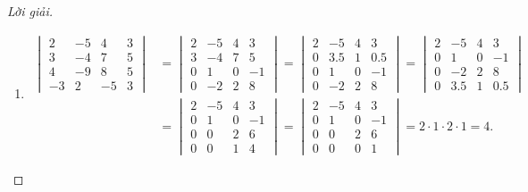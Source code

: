 \documentclass[class=linear-algebra,crop=false]{standalone}
\begin{document}
\begin{proof}[Lời giải]
	\begin{enumerate}[label = (\alph*)]
		\item
		      \begin{align*}
			      \begin{vmatrix}
				      2  & -5 & 4  & 3 \\
				      3  & -4 & 7  & 5 \\
				      4  & -9 & 8  & 5 \\
				      -3 & 2  & -5 & 3
			      \end{vmatrix}
			       & =
			      \begin{vmatrix}
				      2 & -5 & 4 & 3  \\
				      3 & -4 & 7 & 5  \\
				      0 & 1  & 0 & -1 \\
				      0 & -2 & 2 & 8
			      \end{vmatrix}
			      =
			      \begin{vmatrix}
				      2 & -5  & 4 & 3   \\
				      0 & 3.5 & 1 & 0.5 \\
				      0 & 1   & 0 & -1  \\
				      0 & -2  & 2 & 8
			      \end{vmatrix}
			      =
			      \begin{vmatrix}
				      2 & -5  & 4 & 3   \\
				      0 & 1   & 0 & -1  \\
				      0 & -2  & 2 & 8   \\
				      0 & 3.5 & 1 & 0.5
			      \end{vmatrix} \\
			       & =
			      \begin{vmatrix}
				      2 & -5 & 4 & 3  \\
				      0 & 1  & 0 & -1 \\
				      0 & 0  & 2 & 6  \\
				      0 & 0  & 1 & 4
			      \end{vmatrix}
			      =
			      \begin{vmatrix}
				      2 & -5 & 4 & 3  \\
				      0 & 1  & 0 & -1 \\
				      0 & 0  & 2 & 6  \\
				      0 & 0  & 0 & 1
			      \end{vmatrix}
			      = 2\cdot 1\cdot 2\cdot 1 = 4.
		      \end{align*}

\end{enumerate}
\end{proof}
\end{document}
